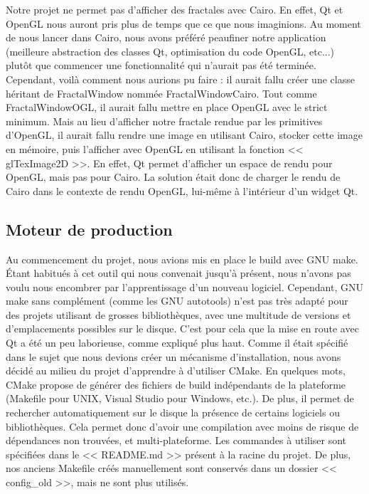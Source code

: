 \documentclass[11pt]{article}
\begin{document}
Notre projet ne permet pas d'afficher des fractales avec Cairo. En effet, Qt et
OpenGL nous auront pris plus de temps que ce que nous imaginions. Au moment de
nous lancer dans Cairo, nous avons préféré peaufiner notre application
(meilleure abstraction des classes Qt, optimisation du code OpenGL, etc...)
plutôt que commencer une fonctionnalité qui n'aurait pas été terminée.
Cependant, voilà comment nous aurions pu faire : il aurait fallu créer une
classe héritant de FractalWindow nommée FractalWindowCairo. Tout comme
FractalWindowOGL, il aurait fallu mettre en place OpenGL avec le strict minimum.
Mais au lieu d'afficher notre fractale rendue par les primitives d'OpenGL, il
aurait fallu rendre une image en utilisant Cairo, stocker cette image en
mémoire, puis l'afficher avec OpenGL en utilisant la fonction << glTexImage2D
>>. En effet, Qt permet d'afficher un espace de rendu pour OpenGL, mais pas pour
Cairo. La solution était donc de charger le rendu de Cairo dans le contexte de
rendu OpenGL, lui-même à l'intérieur d'un widget Qt.

\subsection{Moteur de production}

Au commencement du projet, nous avions mis en place le build avec GNU make.
Étant habitués à cet outil qui nous convenait jusqu'à présent, nous n'avons pas
voulu nous encombrer par l'apprentissage d'un nouveau logiciel. Cependant, GNU
make sans complément (comme les GNU autotools) n'est pas très adapté pour des
projets utilisant de grosses bibliothèques, avec une multitude de versions et
d'emplacements possibles sur le disque. C'est pour cela que la mise en route
avec Qt a été un peu laborieuse, comme expliqué plus haut. Comme il était
spécifié dans le sujet que nous devions créer un mécanisme d'installation, nous
avons décidé au milieu du projet d'apprendre à d'utiliser CMake. En quelques
mots, CMake propose de générer des fichiers de build indépendants de la
plateforme (Makefile pour UNIX, Visual Studio pour Windows, etc.). De plus, il
permet de rechercher automatiquement sur le disque la présence de certains
logiciels ou bibliothèques. Cela permet donc d'avoir une compilation avec moins
de risque de dépendances non trouvées, et multi-plateforme. Les commandes à
utiliser sont spécifiées dans le << README.md >> présent à la racine du projet.
De plus, nos anciens Makefile créés manuellement sont conservés dans un dossier
<< config\_old >>, mais ne sont plus utilisés.
\end{document}
